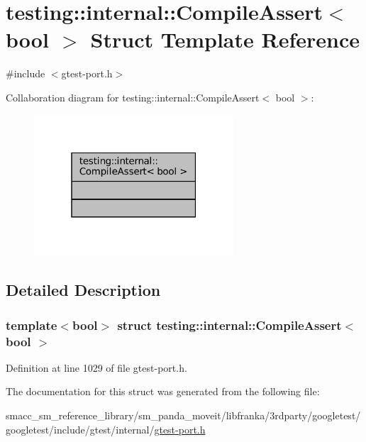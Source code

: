 \hypertarget{structtesting_1_1internal_1_1CompileAssert}{}\section{testing\+:\+:internal\+:\+:Compile\+Assert$<$ bool $>$ Struct Template Reference}
\label{structtesting_1_1internal_1_1CompileAssert}


{\ttfamily \#include $<$gtest-\/port.\+h$>$}



Collaboration diagram for testing\+:\+:internal\+:\+:Compile\+Assert$<$ bool $>$\+:
\nopagebreak
\begin{figure}[H]
\begin{center}
\leavevmode
\includegraphics[width=211pt]{structtesting_1_1internal_1_1CompileAssert__coll__graph}
\end{center}
\end{figure}


\subsection{Detailed Description}
\subsubsection*{template$<$bool$>$\newline
struct testing\+::internal\+::\+Compile\+Assert$<$ bool $>$}



Definition at line 1029 of file gtest-\/port.\+h.



The documentation for this struct was generated from the following file\+:\begin{DoxyCompactItemize}
\item 
smacc\+\_\+sm\+\_\+reference\+\_\+library/sm\+\_\+panda\+\_\+moveit/libfranka/3rdparty/googletest/googletest/include/gtest/internal/\hyperlink{gtest-port_8h}{gtest-\/port.\+h}\end{DoxyCompactItemize}
